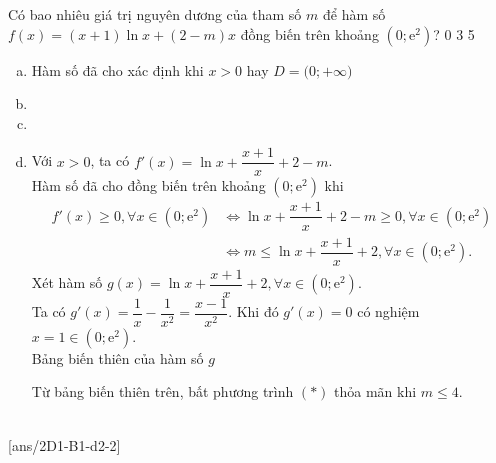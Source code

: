 \begin{ex}
	Có bao nhiêu giá trị nguyên dương của tham số $m$ để hàm số $f(x)=(x+1)\ln x+(2-m)x$ đồng biến trên khoảng $(0;\mathrm{e}^2)$?
	\choice
	{0}
	{3}
	{5}
	{}
	\loigiai
	{
		\begin{enumerate}[a)]
			\item Hàm số đã cho xác định khi $x>0$ hay $D=\big(0;+\infty\big)$
			\item
			\item
			\item Với $x>0$, ta có $f'(x)=\ln x+\dfrac{x+1}{x}+2-m$.\\
			Hàm số đã cho đồng biến trên khoảng $(0;\mathrm{e}^2)$ khi
			\allowdisplaybreaks
			\begin{align*}
				f'(x) \geq 0, \forall x \in (0;\mathrm{e}^2) &\Leftrightarrow \ln x+\dfrac{x+1}{x}+2-m \geq 0, \forall x \in (0;\mathrm{e}^2)\\
				&\Leftrightarrow m \leq \ln x+\dfrac{x+1}{x}+2, \forall x \in (0;\mathrm{e}^2). \tag{$*$}
			\end{align*}
			Xét hàm số $g(x)=\ln x+\dfrac{x+1}{x}+2, \forall x \in (0;\mathrm{e}^2)$.\\
			Ta có $g'(x)=\dfrac{1}{x}-\dfrac{1}{x^2}=\dfrac{x-1}{x^2}$. Khi đó $g'(x)=0$ có nghiệm $x=1 \in (0;\mathrm{e}^2)$.\\
			Bảng biến thiên của hàm số $g$
			\begin{center}
			\end{center}
			Từ bảng biến thiên trên, bất phương trình $(*)$ thỏa mãn khi $m \leq 4$.
	\end{enumerate}	}
\end{ex} 



 \\
	
[ans/2D1-B1-d2-2]

